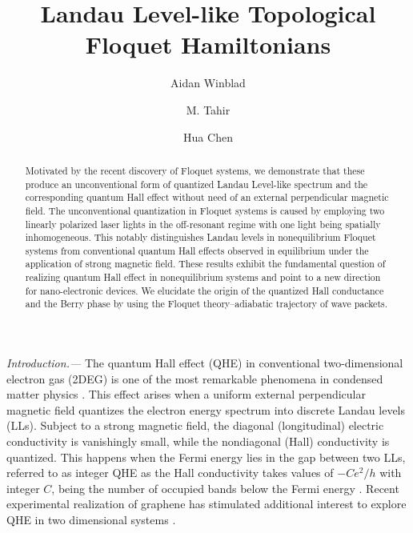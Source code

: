 \documentclass[aps,prb,twocolumn,showpacs,superscriptaddress]{revtex4-2}
\begin{document}
\title{Landau Level-like Topological Floquet Hamiltonians}

\author{Aidan Winblad}

\author{M. Tahir}

\author{Hua Chen}

\begin{abstract}
Motivated by the recent discovery of Floquet systems, we demonstrate that these produce an unconventional form of quantized Landau Level-like spectrum and the corresponding quantum Hall effect without need of an external perpendicular magnetic field.
The unconventional quantization in Floquet systems is caused by employing two linearly polarized laser lights in the off-resonant regime with one light being spatially inhomogeneous.
This notably distinguishes Landau levels in nonequilibrium Floquet systems from conventional quantum Hall effects observed in equilibrium under the application of strong magnetic field.
These results exhibit the fundamental question of realizing quantum Hall effect in nonequilibrium systems and point to a new direction for nano-electronic devices.
We elucidate the origin of the quantized Hall conductance and the Berry phase by using the Floquet theory--adiabatic trajectory of wave packets.
\end{abstract}

\maketitle

\emph{Introduction.---} The quantum Hall effect (QHE) in conventional two-dimensional electron gas (2DEG) is one of the most remarkable phenomena in condensed matter physics \cite{QHE1}.
This effect arises when a uniform external perpendicular magnetic field quantizes the electron energy spectrum into discrete Landau levels (LLs).
Subject to a strong magnetic field, the diagonal (longitudinal) electric conductivity is vanishingly small, while the nondiagonal (Hall) conductivity is quantized.
This happens when the Fermi energy lies in the gap between two LLs, referred to as integer QHE as the Hall conductivity takes values of $-Ce^2/h$ with integer $C$, being the number of occupied bands below the Fermi energy \cite{QHE4}.
Recent experimental realization of graphene has stimulated additional interest to explore QHE in two dimensional systems \cite{QHE2, QHE3, QHE4}.
\end{document}

